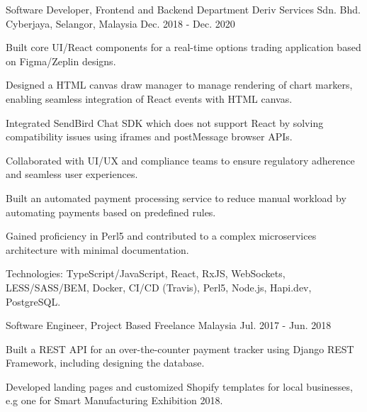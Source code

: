 \begin{cventries}
  \cventry
    {Software Developer, Frontend and Backend Department} %
    {Deriv Services Sdn. Bhd.} %
    {Cyberjaya, Selangor, Malaysia} %
    {Dec. 2018 - Dec. 2020} %
    {
      \begin{cvitems} %
        \item {Built core UI/React components for a real-time options trading application based on Figma/Zeplin designs.}
        \item {Designed a HTML canvas draw manager to manage rendering of chart markers, enabling seamless integration of React events with HTML canvas.}
        \item {Integrated SendBird Chat SDK which does not support React by solving compatibility issues using iframes and postMessage browser APIs.}
        \item {Collaborated with UI/UX and compliance teams to ensure regulatory adherence and seamless user experiences.}
        \item {Built an automated payment processing service to reduce manual workload by automating payments based on predefined rules.}
        \item {Gained proficiency in Perl5 and contributed to a complex microservices architecture with minimal documentation.}
        \item {Technologies: TypeScript/JavaScript, React, RxJS, WebSockets, LESS/SASS/BEM, Docker, CI/CD (Travis), Perl5, Node.js, Hapi.dev, PostgreSQL.}
      \end{cvitems}
    }

  \cventry
    {Software Engineer, Project Based} %
    {Freelance} %
    {Malaysia} %
    {Jul. 2017 - Jun. 2018} %
    {
      \begin{cvitems} %
        \item {Built a REST API for an over-the-counter payment tracker using Django REST Framework, including designing the database.}
        \item {Developed landing pages and customized Shopify templates for local businesses, e.g one for Smart Manufacturing Exhibition 2018.}
      \end{cvitems}
    }

\end{cventries}
